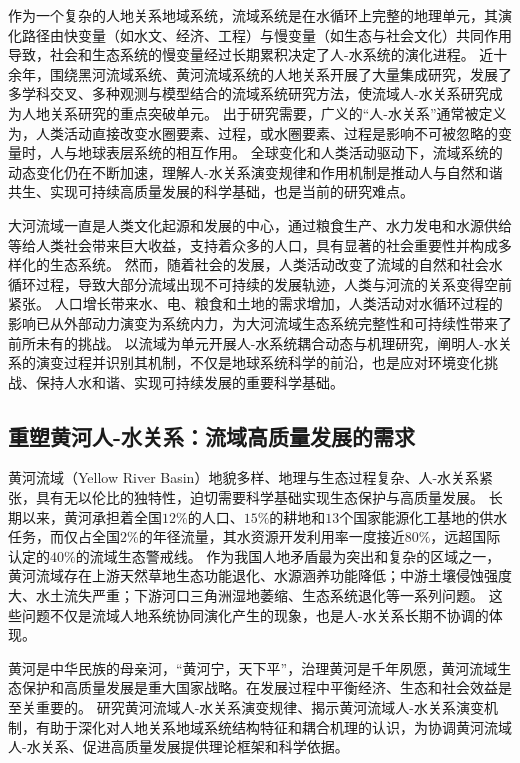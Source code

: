 作为一个复杂的人地关系地域系统，流域系统是在水循环上完整的地理单元，其演化路径由快变量（如水文、经济、工程）与慢变量（如生态与社会文化）共同作用导致，社会和生态系统的慢变量经过长期累积决定了人-水系统的演化进程\cite{falkenmark2021}。
近十余年，围绕黑河流域系统、黄河流域系统的人地关系开展了大量集成研究，发展了多学科交叉、多种观测与模型结合的流域系统研究方法，使流域人-水关系研究成为人地关系研究的重点突破单元\cite{cheng2014, fu2021}。
出于研究需要，广义的“人-水关系”通常被定义为，人类活动直接改变水圈要素、过程，或水圈要素、过程是影响不可被忽略的变量时，人与地球表层系统的相互作用。
全球变化和人类活动驱动下，流域系统的动态变化仍在不断加速，理解人-水关系演变规律和作用机制是推动人与自然和谐共生、实现可持续高质量发展的科学基础，也是当前的研究难点\cite{reyers2018}。

大河流域一直是人类文化起源和发展的中心，通过粮食生产、水力发电和水源供给等给人类社会带来巨大收益，支持着众多的人口，具有显著的社会重要性并构成多样化的生态系统\cite{best2019}。
然而，随着社会的发展，人类活动改变了流域的自然和社会水循环过程，导致大部分流域出现不可持续的发展轨迹，人类与河流的关系变得空前紧张\cite{best2019, best2020}。
人口增长带来水、电、粮食和土地的需求增加，人类活动对水循环过程的影响已从外部动力演变为系统内力，为大河流域生态系统完整性和可持续性带来了前所未有的挑战\cite{crutzen2006, dibaldassarre2019}。
以流域为单元开展人-水系统耦合动态与机理研究，阐明人-水关系的演变过程并识别其机制，不仅是地球系统科学的前沿，也是应对环境变化挑战、保持人水和谐、实现可持续发展的重要科学基础。

\subsection{重塑黄河人-水关系：流域高质量发展的需求}

黄河流域（Yellow River Basin）地貌多样、地理与生态过程复杂、人-水关系紧张，具有无以伦比的独特性，迫切需要科学基础实现生态保护与高质量发展。
长期以来，黄河承担着全国$12\%$的人口、$15\%$的耕地和$13$个国家能源化工基地的供水任务，而仅占全国$2\%$的年径流量，其水资源开发利用率一度接近$80\%$，远超国际认定的$40\%$的流域生态警戒线\cite{fu2021}。
作为我国人地矛盾最为突出和复杂的区域之一，黄河流域存在上游天然草地生态功能退化、水源涵养功能降低；中游土壤侵蚀强度大、水土流失严重；下游河口三角洲湿地萎缩、生态系统退化等一系列问题\cite{mazhuguo2020}。
这些问题不仅是流域人地系统协同演化产生的现象，也是人-水关系长期不协调的体现\cite{fu2021}。

黄河是中华民族的母亲河，“黄河宁，天下平”，治理黄河是千年夙愿，黄河流域生态保护和高质量发展是重大国家战略。在发展过程中平衡经济、生态和社会效益是至关重要的。
研究黄河流域人-水关系演变规律、揭示黄河流域人-水关系演变机制，有助于深化对人地关系地域系统结构特征和耦合机理的认识，为协调黄河流域人-水关系、促进高质量发展提供理论框架和科学依据。
